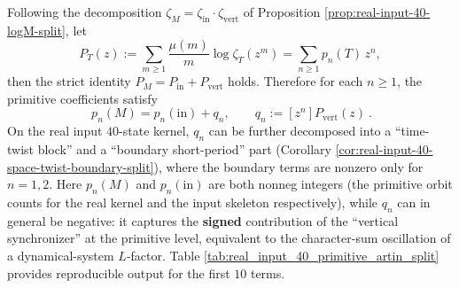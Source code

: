 \begin{remark}\label{rem:real-input-40-primitive-artin-signed}
Following the decomposition \(\zeta_M=\zeta_{\mathrm{in}}\cdot\zeta_{\mathrm{vert}}\) of Proposition \ref{prop:real-input-40-logM-split},
let
\[
P_T(z):=\sum_{m\ge 1}\frac{\mu(m)}{m}\log\zeta_T(z^m)=\sum_{n\ge 1}p_n(T)\,z^n,
\]
then the strict identity \(P_M=P_{\mathrm{in}}+P_{\mathrm{vert}}\) holds. Therefore for each \(n\ge 1\), the primitive coefficients satisfy
\[
\boxed{\ p_n(M)=p_n(\mathrm{in})+q_n,\qquad q_n:=[z^n]P_{\mathrm{vert}}(z)\ }.
\]
On the real input \(40\)-state kernel, \(q_n\) can be further decomposed into a ``time-twist block'' and a ``boundary short-period'' part (Corollary \ref{cor:real-input-40-space-twist-boundary-split}), where the boundary terms are nonzero only for \(n=1,2\).
Here \(p_n(M)\) and \(p_n(\mathrm{in})\) are both nonneg integers (the primitive orbit counts for the real kernel and the input skeleton respectively), while \(q_n\) can in general be negative: it captures the \textbf{signed} contribution of the ``vertical synchronizer'' at the primitive level, equivalent to the character-sum oscillation of a dynamical-system $L$-factor.
Table \ref{tab:real_input_40_primitive_artin_split} provides reproducible output for the first \(10\) terms.

\end{remark}



